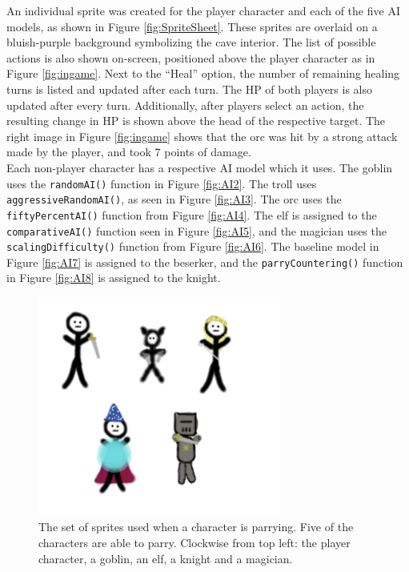 An individual sprite was created for the player character and each of the five AI models, as shown in Figure \ref{fig:SpriteSheet}. These sprites are overlaid on a bluish-purple background symbolizing the cave interior. The list of possible actions is also shown on-screen, positioned above the player character as in Figure \ref{fig:ingame}. Next to the ``Heal'' option, the number of remaining healing turns is listed and updated after each turn. The HP of both players is also updated after every turn. Additionally, after players select an action, the resulting change in HP is shown above the head of the respective target. The right image in Figure \ref{fig:ingame} shows that the orc was hit by a strong attack made by the player, and took 7 points of damage.\\

Each non-player character has a respective AI model which it uses. The goblin uses the \texttt{randomAI()} function in Figure \ref{fig:AI2}. The troll uses \texttt{aggressiveRandomAI()}, as seen in Figure \ref{fig:AI3}. The orc uses the \texttt{fiftyPercentAI()} function from Figure \ref{fig:AI4}. The elf is assigned to the \texttt{comparativeAI()} function seen in Figure \ref{fig:AI5}, and the magician uses the \texttt{scalingDifficulty()} function from Figure \ref{fig:AI6}. The baseline model in Figure \ref{fig:AI7} is assigned to the beserker, and the \texttt{parryCountering()} function in Figure \ref{fig:AI8} is assigned to the knight.

\begin{figure}[H]
  \centering
  \includegraphics[width=8cm]{sprites/ParrySheet.png}
  \caption{The set of sprites used when a character is parrying. Five of the characters are able to parry. Clockwise from top left: the player character, a goblin, an elf, a knight and a magician.}
  \label{fig:ParrySheet}
\end{figure}

